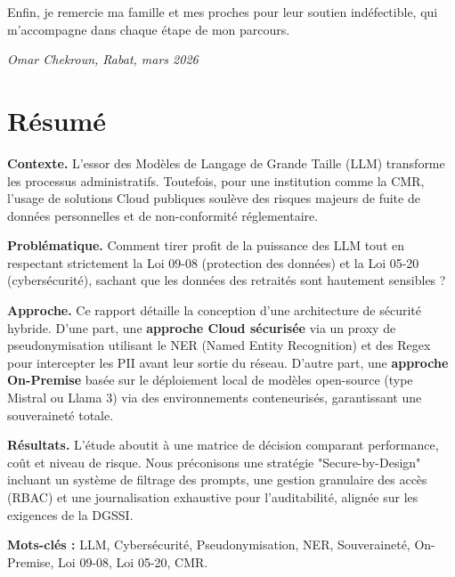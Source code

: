 \documentclass[12pt, a4paper]{report}
\begin{document}
Enfin, je remercie ma famille et mes proches pour leur soutien indéfectible, qui m'accompagne dans chaque étape de mon parcours.

\vspace{1cm}
\hfill\textit{Omar Chekroun, Rabat, mars 2026}

\newpage
\thispagestyle{plain}
\chapter*{Résumé}

\textbf{Contexte.} 
L'essor des Modèles de Langage de Grande Taille (LLM) transforme les processus administratifs. Toutefois, pour une institution comme la CMR, l'usage de solutions Cloud publiques soulève des risques majeurs de fuite de données personnelles et de non-conformité réglementaire.

\medskip
\textbf{Problématique.} 
Comment tirer profit de la puissance des LLM tout en respectant strictement la Loi 09-08 (protection des données) et la Loi 05-20 (cybersécurité), sachant que les données des retraités sont hautement sensibles ?

\medskip
\textbf{Approche.} 
Ce rapport détaille la conception d'une architecture de sécurité hybride. D'une part, une \textbf{approche Cloud sécurisée} via un proxy de pseudonymisation utilisant le NER (Named Entity Recognition) et des Regex pour intercepter les PII avant leur sortie du réseau. D'autre part, une \textbf{approche On-Premise} basée sur le déploiement local de modèles open-source (type Mistral ou Llama 3) via des environnements conteneurisés, garantissant une souveraineté totale.

\medskip
\textbf{Résultats.} 
L'étude aboutit à une matrice de décision comparant performance, coût et niveau de risque. Nous préconisons une stratégie "Secure-by-Design" incluant un système de filtrage des prompts, une gestion granulaire des accès (RBAC) et une journalisation exhaustive pour l'auditabilité, alignée sur les exigences de la DGSSI.

\medskip
\textbf{Mots-clés :} LLM, Cybersécurité, Pseudonymisation, NER, Souveraineté, On-Premise, Loi 09-08, Loi 05-20, CMR.

\vspace{1.2cm}
\end{document}
